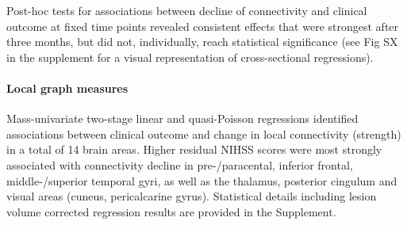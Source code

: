 \documentclass[]{article}
\let\oldparagraph\paragraph
\renewcommand{\paragraph}[1]{\oldparagraph{#1}\mbox{}}
\begin{document}
Post-hoc tests for associations between decline of connectivity and
clinical outcome at fixed time points revealed consistent effects that
were strongest after three months, but did not, individually, reach
statistical significance (see Fig SX in the supplement for a visual
representation of cross-sectional regressions).

\hypertarget{local-graph-measures}{%
\paragraph{Local graph measures}\label{local-graph-measures}}

Mass-univariate two-stage linear and quasi-Poisson regressions
identified associations between clinical outcome and change in local
connectivity (strength) in a total of 14 brain areas. Higher residual
NIHSS scores were most strongly associated with connectivity decline in
pre-/paracental, inferior frontal, middle-/superior temporal gyri, as
well as the thalamus, posterior cingulum and visual areas (cuneus,
pericalcarine gyrus). Statistical details including lesion volume
corrected regression results are provided in the Supplement.
\end{document}
